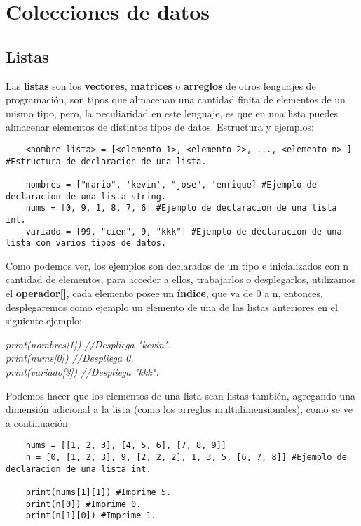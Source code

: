 \section{Colecciones de datos}


\subsection{Listas}
\hspace{0.55cm}Las \textbf{listas} son los \textbf{vectores}, \textbf{matrices} o \textbf{arreglos} de otros lenguajes de programación, son tipos que almacenan una cantidad finita de elementos de un mismo tipo, pero, la peculiaridad en este lenguaje, es que en una lista puedes almacenar elementos de distintos tipos de datos. Estructura y ejemplos:
\begin{lstlisting}
	<nombre lista> = [<elemento 1>, <elemento 2>, ..., <elemento n> ] #Estructura de declaracion de una lista.

	nombres = ["mario", 'kevin', "jose", 'enrique] #Ejemplo de declaracion de una lista string.
	nums = [0, 9, 1, 8, 7, 6] #Ejemplo de declaracion de una lista int.
	variado = [99, "cien", 9, "kkk"] #Ejemplo de declaracion de una lista con varios tipos de datos.
\end{lstlisting}

Como podemos ver, los ejemplos son declarados de un tipo e inicializados con n cantidad de elementos, para acceder a ellos, trabajarlos o desplegarlos, utilizamos el \textbf{operador[]}, cada elemento posee un \textbf{índice}, que va de 0 a n, entonces, desplegaremos como ejemplo un elemento de una de las listas anteriores en el siguiente ejemplo:
\begin{center}
	\textit{print(nombres[1]) //Despliega "kevin".\\print(nums[0]) //Despliega 0.\\print(variado[3]) //Despliega "kkk".}
\end{center}

Podemos hacer que los elementos de una lista sean listas también, agregando una dimensión adicional a la lista (como los arreglos multidimensionales), como se ve a continuación:
\begin{lstlisting}
	nums = [[1, 2, 3], [4, 5, 6], [7, 8, 9]]
	n = [0, [1, 2, 3], 9, [2, 2, 2], 1, 3, 5, [6, 7, 8]] #Ejemplo de declaracion de una lista int.
	
	print(nums[1][1]) #Imprime 5.
	print(n[0]) #Imprime 0.
	print(n[1][0]) #Imprime 1.
\end{lstlisting}

